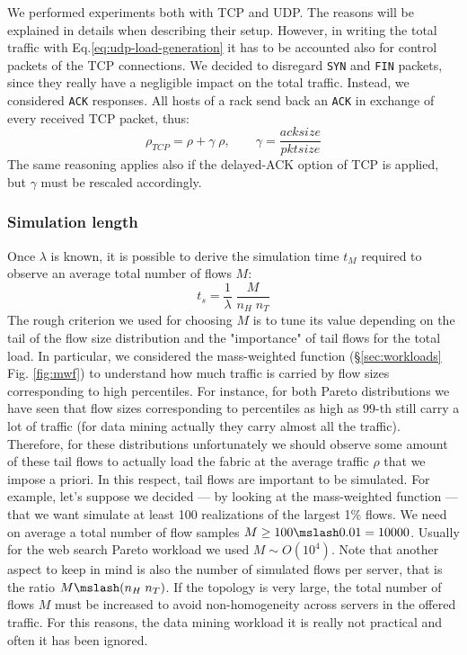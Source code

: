 We performed experiments both with TCP and UDP. The reasons will be explained in details when describing their setup. However, in writing the total traffic with Eq.\eqref{eq:udp-load-generation} it has to be accounted also for control packets of the TCP connections. We decided to disregard \texttt{SYN} and \texttt{FIN} packets, since they really have a negligible impact on the total traffic.  Instead, we considered \texttt{ACK} responses. All hosts of a rack send back an \texttt{ACK} in exchange of every received TCP packet, thus:
\begin{equation}
	\rho_{TCP} = \rho + \gamma \; \rho, \qquad \gamma = \dfrac{acksize}{pktsize}
\end{equation}
The same reasoning applies also if the delayed-ACK option of TCP is applied, but $\gamma$ must be rescaled accordingly.  \\
\subsubsection{Simulation length}
Once $\lambda$ is known, it is possible to derive the simulation time $t_M$ required to observe an average total number of flows $M$:
\[
t_s = \dfrac{1}{\lambda}\;\frac{M}{n_H \; n_T}
\]
The rough criterion we used for choosing $M$ is to tune its value depending on the tail of the flow size distribution and the "importance" of tail flows for the total load. In particular, we considered the mass-weighted function (\S \ref{sec:workloads} Fig. \ref{fig:mwf}) to understand how much traffic is carried by flow sizes corresponding to high percentiles. For instance, for both Pareto distributions we have seen that flow sizes corresponding to percentiles as high as 99-th still carry a lot of traffic (for data mining actually they carry almost all the traffic). Therefore, for these distributions unfortunately we should observe some amount of these tail flows to actually load the fabric at the average traffic $\rho$ that we impose a priori. In this respect, tail flows are important to be simulated. For example, let's suppose we decided --- by looking at the mass-weighted function --- that we want simulate at least 100 realizations of the largest 1\% flows. We need on average a total number of flow samples $M \ge 100 \mslash 0.01 = 10000$. Usually for the web search Pareto workload we used $M \sim O(10^{4})$. Note that another aspect to keep in mind is also the number of simulated flows per server, that is the ratio $M \mslash (n_H \; n_T)$. If the topology is very large, the total number of flows $M$ must be increased to avoid non-homogeneity across servers in the offered traffic. For this reasons, the data mining workload it is really not practical and often it has been ignored.
